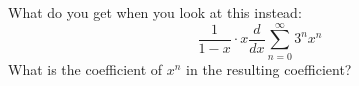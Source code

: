 What do you get when you look at this instead:
\[
\frac{1}{1-x} \cdot x \frac{d}{dx} \sum_{n=0}^\infty 3^n x^n
\]
What is the coefficient of $x^n$ in the resulting coefficient?
